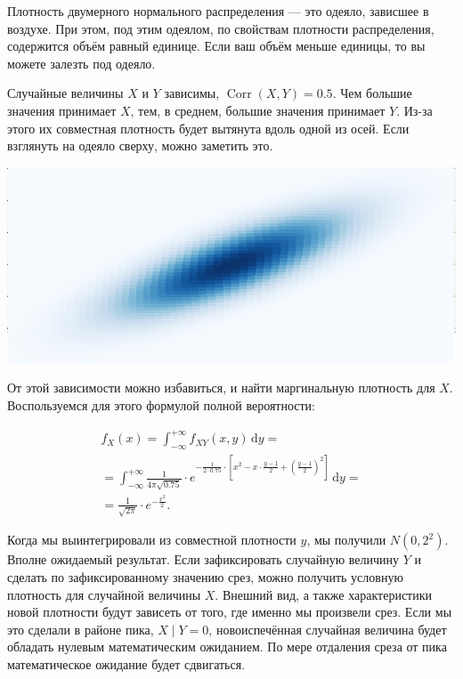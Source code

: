 \documentclass[12pt, a4paper, oneside]{extreport}
\DeclareMathOperator{\Corr}{Corr}
\newcommand{\dx}[1]{\,\mathrm{d}#1} %
\theoremstyle{plain}              %
\theoremstyle{definition}         %
\begin{document}
Плотность двумерного нормального распределения --- это одеяло, зависшее в воздухе. При этом, под этим одеялом, по свойствам плотности распределения,  содержится объём равный единице. Если ваш объём меньше единицы, то вы можете залезть под одеяло. 

Случайные величины $X$ и $Y$ зависимы, $\Corr(X,Y) = 0.5$. Чем большие значения принимает $X$, тем, в среднем, большие значения принимает $Y$.   Из-за этого их совместная плотность будет вытянута вдоль одной из осей. Если взглянуть на одеяло сверху, можно заметить это. 


\begin{center}
\includegraphics[scale=0.25]{two_normal_2.png}
\end{center}

От этой зависимости можно избавиться, и найти маргинальную плотность для $X$. Воспользуемся для этого формулой полной вероятности: 

\begin{multline*}
f_X(x) = \int_{-\infty}^{+\infty} f_{XY}(x,y) \dx{y} = \\ = \int_{-\infty}^{+\infty} \frac{1}{4 \pi \sqrt{0.75}} \cdot e^{-\frac{1}{2 \cdot 0.75} \cdot \left[ x^2 - x \cdot \frac{y - 1}{2} + \left( \frac{y - 1}{2}    \right)^2   \right]} \dx{y}  = \\ = \frac{1}{\sqrt{2 \pi} }\cdot e^{-\frac{x^2}{2}}.
\end{multline*}

Когда мы выинтегрировали из совместной плотности $y$, мы получили $N(0,2^2)$. Вполне ожидаемый результат.  Если зафиксировать случайную величину $Y$ и сделать по зафиксированному значению срез, можно получить условную плотность для случайной величины $X$.  Внешний вид, а также характеристики новой плотности  будут зависеть от того, где именно мы произвели срез. Если мы это сделали в районе пика, $X \mid Y=0$,  новоиспечённая случайная величина будет обладать нулевым математическим ожиданием. По мере отдаления среза от пика математическое ожидание будет сдвигаться. 
\end{document}
